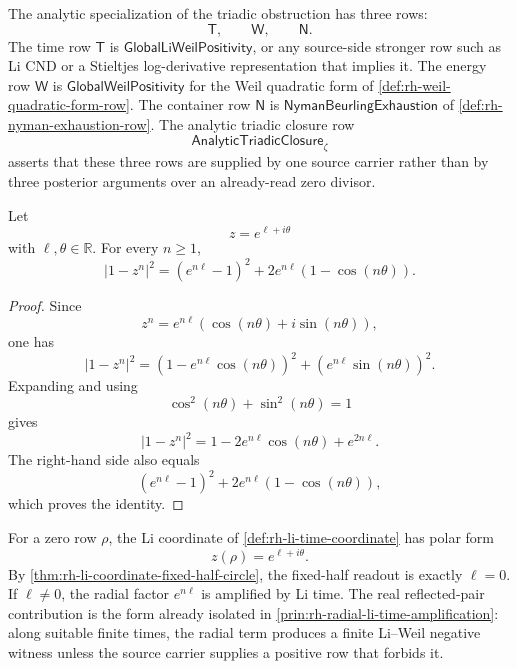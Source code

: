 \begin{definition}
\label{def:rh-analytic-triadic-closure}
The analytic specialization of the triadic obstruction has three rows:
$$
\mathsf T,\qquad \mathsf W,\qquad \mathsf N.
$$
The time row $\mathsf T$ is $\mathsf{GlobalLiWeilPositivity}$, or any
source-side stronger row such as Li CND or a Stieltjes log-derivative
representation that implies it.  The energy row $\mathsf W$ is
$\mathsf{GlobalWeilPositivity}$ for the Weil quadratic form of
\autoref{def:rh-weil-quadratic-form-row}.  The container row $\mathsf N$
is $\mathsf{NymanBeurlingExhaustion}$ of
\autoref{def:rh-nyman-exhaustion-row}.  The analytic triadic closure row
$$
\mathsf{AnalyticTriadicClosure}_{\zeta}
$$
asserts that these three rows are supplied by one source carrier rather
than by three posterior arguments over an already-read zero divisor.
\end{definition}

\begin{theorem}
\label{thm:rh-li-coordinate-pythagorean-decomposition}
Let
$$
z=e^{\ell+i\theta}
$$
with $\ell,\theta\in\mathbb R$.  For every $n\ge1$,
$$
|1-z^n|^2
=
(e^{n\ell}-1)^2
+
2e^{n\ell}(1-\cos(n\theta)).
$$
\end{theorem}

\begin{proof}
Since
$$
z^n=e^{n\ell}(\cos(n\theta)+i\sin(n\theta)),
$$
one has
$$
|1-z^n|^2
=
(1-e^{n\ell}\cos(n\theta))^2
+
(e^{n\ell}\sin(n\theta))^2.
$$
Expanding and using
$$
\cos^2(n\theta)+\sin^2(n\theta)=1
$$
gives
$$
|1-z^n|^2
=
1-2e^{n\ell}\cos(n\theta)+e^{2n\ell}.
$$
The right-hand side also equals
$$
(e^{n\ell}-1)^2
+
2e^{n\ell}(1-\cos(n\theta)),
$$
which proves the identity.
\end{proof}

\begin{principle}
\label{prin:rh-radial-li-defect-time-projection}
For a zero row $\rho$, the Li coordinate of
\autoref{def:rh-li-time-coordinate} has polar form
$$
z(\rho)=e^{\ell+i\theta}.
$$
By \autoref{thm:rh-li-coordinate-fixed-half-circle}, the fixed-half
readout is exactly $\ell=0$.  If $\ell\ne0$, the radial factor
$e^{n\ell}$ is amplified by Li time.  The real reflected-pair
contribution is the form already isolated in
\autoref{prin:rh-radial-li-time-amplification}: along suitable finite
times, the radial term produces a finite Li--Weil negative witness
unless the source carrier supplies a positive row that forbids it.
\end{principle}

